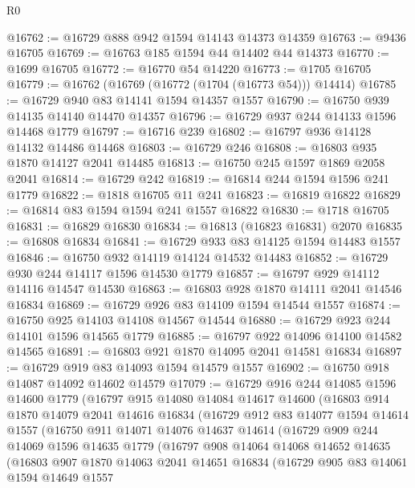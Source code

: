 \begin{lexlean}{R0}
\begin{coremodule}
@16762 := @16729 @888 @942 @1594 @14143 @14373 @14359
@16763 := @9436 @16705
@16769 := @16763 @185 @1594 @44 @14402 @44 @14373
@16770 := @1699 @16705
@16772 := @16770 @54 @14220
@16773 := @1705 @16705
@16779 := @16762 (@16769 (@16772 (@1704 (@16773 @54))) @14414)
@16785 := @16729 @940 @83 @14141 @1594 @14357 @1557
@16790 := @16750 @939 @14135 @14140 @14470 @14357
@16796 := @16729 @937 @244 @14133 @1596 @14468 @1779
@16797 := @16716 @239
@16802 := @16797 @936 @14128 @14132 @14486 @14468
@16803 := @16729 @246
@16808 := @16803 @935 @1870 @14127 @2041 @14485
@16813 := @16750 @245 @1597 @1869 @2058 @2041
@16814 := @16729 @242
@16819 := @16814 @244 @1594 @1596 @241 @1779
@16822 := @1818 @16705 @11 @241
@16823 := @16819 @16822
@16829 := @16814 @83 @1594 @1594 @241 @1557 @16822
@16830 := @1718 @16705
@16831 := @16829 @16830
@16834 := @16813 (@16823 @16831) @2070
@16835 := @16808 @16834
@16841 := @16729 @933 @83 @14125 @1594 @14483 @1557
@16846 := @16750 @932 @14119 @14124 @14532 @14483
@16852 := @16729 @930 @244 @14117 @1596 @14530 @1779
@16857 := @16797 @929 @14112 @14116 @14547 @14530
@16863 := @16803 @928 @1870 @14111 @2041 @14546 @16834
@16869 := @16729 @926 @83 @14109 @1594 @14544 @1557
@16874 := @16750 @925 @14103 @14108 @14567 @14544
@16880 := @16729 @923 @244 @14101 @1596 @14565 @1779
@16885 := @16797 @922 @14096 @14100 @14582 @14565
@16891 := @16803 @921 @1870 @14095 @2041 @14581 @16834
@16897 := @16729 @919 @83 @14093 @1594 @14579 @1557
@16902 := @16750 @918 @14087 @14092 @14602 @14579
@17079 := @16729
    @916
    @244
    @14085
    @1596
    @14600
    @1779
    (@16797
      @915
      @14080
      @14084
      @14617
      @14600
      (@16803
        @914
        @1870
        @14079
        @2041
        @14616
        @16834
        (@16729
          @912
          @83
          @14077
          @1594
          @14614
          @1557
          (@16750
            @911
            @14071
            @14076
            @14637
            @14614
            (@16729
              @909
              @244
              @14069
              @1596
              @14635
              @1779
              (@16797
                @908
                @14064
                @14068
                @14652
                @14635
                (@16803
                  @907
                  @1870
                  @14063
                  @2041
                  @14651
                  @16834
                  (@16729
                    @905
                    @83
                    @14061
                    @1594
                    @14649
                    @1557

\end{coremodule}
\end{lexlean}
